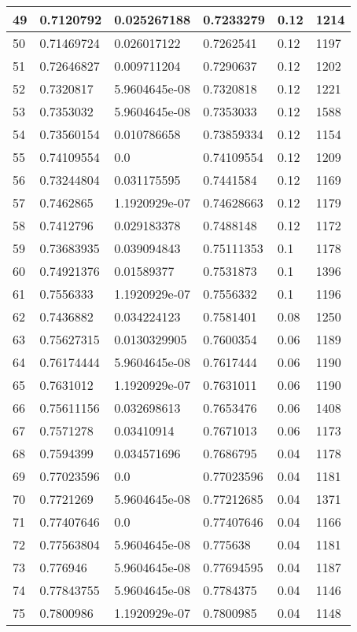 \begin{longtable}{|l|l|l|l|l|l|}
49 & 0.7120792 & 0.025267188 & 0.7233279 & 0.12 & 1214 \\ \hline 
50 & 0.71469724 & 0.026017122 & 0.7262541 & 0.12 & 1197 \\ \hline 
51 & 0.72646827 & 0.009711204 & 0.7290637 & 0.12 & 1202 \\ \hline 
52 & 0.7320817 & 5.9604645e-08 & 0.7320818 & 0.12 & 1221 \\ \hline 
53 & 0.7353032 & 5.9604645e-08 & 0.7353033 & 0.12 & 1588 \\ \hline 
54 & 0.73560154 & 0.010786658 & 0.73859334 & 0.12 & 1154 \\ \hline 
55 & 0.74109554 & 0.0 & 0.74109554 & 0.12 & 1209 \\ \hline 
56 & 0.73244804 & 0.031175595 & 0.7441584 & 0.12 & 1169 \\ \hline 
57 & 0.7462865 & 1.1920929e-07 & 0.74628663 & 0.12 & 1179 \\ \hline 
58 & 0.7412796 & 0.029183378 & 0.7488148 & 0.12 & 1172 \\ \hline 
59 & 0.73683935 & 0.039094843 & 0.75111353 & 0.1 & 1178 \\ \hline 
60 & 0.74921376 & 0.01589377 & 0.7531873 & 0.1 & 1396 \\ \hline 
61 & 0.7556333 & 1.1920929e-07 & 0.7556332 & 0.1 & 1196 \\ \hline 
62 & 0.7436882 & 0.034224123 & 0.7581401 & 0.08 & 1250 \\ \hline 
63 & 0.75627315 & 0.0130329905 & 0.7600354 & 0.06 & 1189 \\ \hline 
64 & 0.76174444 & 5.9604645e-08 & 0.7617444 & 0.06 & 1190 \\ \hline 
65 & 0.7631012 & 1.1920929e-07 & 0.7631011 & 0.06 & 1190 \\ \hline 
66 & 0.75611156 & 0.032698613 & 0.7653476 & 0.06 & 1408 \\ \hline 
67 & 0.7571278 & 0.03410914 & 0.7671013 & 0.06 & 1173 \\ \hline 
68 & 0.7594399 & 0.034571696 & 0.7686795 & 0.04 & 1178 \\ \hline 
69 & 0.77023596 & 0.0 & 0.77023596 & 0.04 & 1181 \\ \hline 
70 & 0.7721269 & 5.9604645e-08 & 0.77212685 & 0.04 & 1371 \\ \hline 
71 & 0.77407646 & 0.0 & 0.77407646 & 0.04 & 1166 \\ \hline 
72 & 0.77563804 & 5.9604645e-08 & 0.775638 & 0.04 & 1181 \\ \hline 
73 & 0.776946 & 5.9604645e-08 & 0.77694595 & 0.04 & 1187 \\ \hline 
74 & 0.77843755 & 5.9604645e-08 & 0.7784375 & 0.04 & 1146 \\ \hline 
75 & 0.7800986 & 1.1920929e-07 & 0.7800985 & 0.04 & 1148 \\ \hline 
\end{longtable}